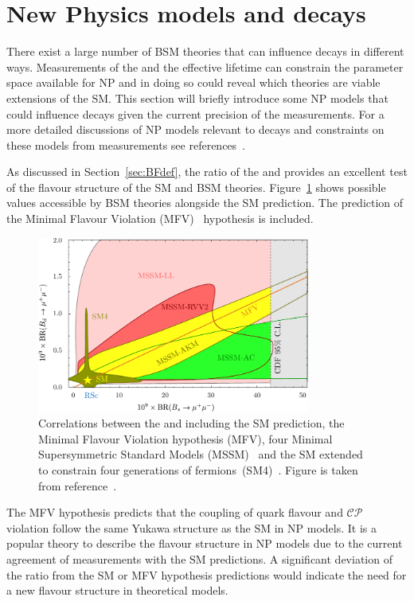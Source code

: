 \section[New Physics models and \bmumu decays]{New Physics models and \boldmath{\bmumu} decays}
\label{sec:NPmodels}
There exist a large number of BSM theories that can influence \bmumu decays in different ways. Measurements of the \bmumu \BFs and the \bsmumu effective lifetime can constrain the parameter space available for NP and in doing so could reveal which theories are viable extensions of the SM. This section will briefly introduce some NP models that could influence \bmumu decays given the current precision of the \BF measurements. %
For a more detailed discussions of NP models relevant to \bmumu decays and constraints on these models from measurements see references~\cite{Buras:2013uqa,Knegjens:2014zva,Altmannshofer:2014rta}.

As discussed in Section~\ref{sec:BFdef}, the ratio of the \bdmumu and \bsmumu \Bfs provides an excellent test of the flavour structure of the SM and BSM theories. %
Figure~\ref{fig:ratio} shows possible values accessible by BSM theories alongside the SM prediction. The prediction of the Minimal Flavour Violation (MFV)~\cite{DAmbrosio:2002vsn} hypothesis is included. %
\begin{figure}[tbp]
    \centering
        \includegraphics[width=0.8\textwidth]{./Figs/Theory/MFV.pdf}
    \caption{Correlations between the \bdmumu and \bsmumu \BFs including the SM prediction, the Minimal Flavour Violation hypothesis (MFV), four Minimal Supersymmetric Standard Models (MSSM)~\cite{Martin:1997ns} and the SM extended to constrain four generations of fermions~(SM4)~\cite{Hou:2008xd}. Figure is taken from reference~\cite{Straub:2010ih}.}
    \label{fig:ratio}
\end{figure}
The MFV hypothesis predicts that the coupling of quark flavour and $\mathcal{CP}$ violation follow the same Yukawa structure as the SM in NP models. It is a popular theory to describe the flavour structure in NP models due to the current agreement of measurements with the SM predictions. A significant deviation of the \BF ratio from the SM or MFV hypothesis predictions would indicate the need for a new flavour structure in theoretical models.

